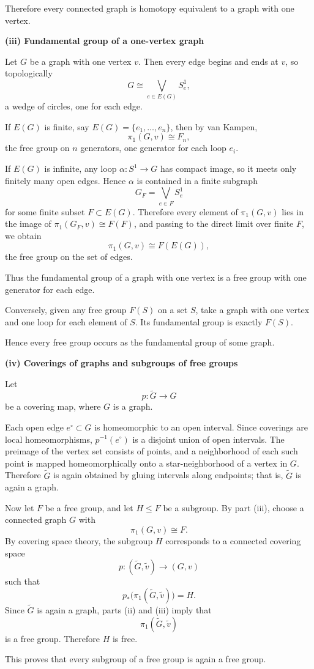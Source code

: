 \begin{solution}
Therefore every connected graph is homotopy equivalent to a graph with one vertex.


\medskip
\noindent\textbf{(iii) Fundamental group of a one-vertex graph}\par
\smallskip

Let \(G\) be a graph with one vertex \(v\). Then every edge begins and ends at \(v\), so topologically
\[
G \cong \bigvee_{e\in E(G)} S^1_e,
\]
a wedge of circles, one for each edge.

If \(E(G)\) is finite, say \(E(G)=\{e_1,\dots,e_n\}\), then by van Kampen,
\[
\pi_1(G,v)\cong F_n,
\]
the free group on \(n\) generators, one generator for each loop \(e_i\).

If \(E(G)\) is infinite, any loop \(\alpha:S^1\to G\) has compact image, so it meets only finitely many open edges. Hence \(\alpha\) is contained in a finite subgraph
\[
G_F=\bigvee_{e\in F} S^1_e
\]
for some finite subset \(F\subset E(G)\). Therefore every element of \(\pi_1(G,v)\) lies in the image of \(\pi_1(G_F,v)\cong F(F)\), and passing to the direct limit over finite \(F\), we obtain
\[
\pi_1(G,v)\cong F(E(G)),
\]
the free group on the set of edges.

Thus the fundamental group of a graph with one vertex is a free group with one generator for each edge.

Conversely, given any free group \(F(S)\) on a set \(S\), take a graph with one vertex and one loop for each element of \(S\). Its fundamental group is exactly \(F(S)\).

Hence every free group occurs as the fundamental group of some graph.


\medskip
\noindent\textbf{(iv) Coverings of graphs and subgroups of free groups}\par
\smallskip

Let
\[
p:\widetilde{G}\longrightarrow G
\]
be a covering map, where \(G\) is a graph.

Each open edge \(e^\circ\subset G\) is homeomorphic to an open interval. Since coverings are local homeomorphisms, \(p^{-1}(e^\circ)\) is a disjoint union of open intervals. The preimage of the vertex set consists of points, and a neighborhood of each such point is mapped homeomorphically onto a star-neighborhood of a vertex in \(G\). Therefore \(\widetilde{G}\) is again obtained by gluing intervals along endpoints; that is, \(\widetilde{G}\) is again a graph.

Now let \(F\) be a free group, and let \(H\leq F\) be a subgroup. By part (iii), choose a connected graph \(G\) with
\[
\pi_1(G,v)\cong F.
\]
By covering space theory, the subgroup \(H\) corresponds to a connected covering space
\[
p:(\widetilde{G},\widetilde{v})\to (G,v)
\]
such that
\[
p_*\bigl(\pi_1(\widetilde{G},\widetilde{v})\bigr)=H.
\]
Since \(\widetilde{G}\) is again a graph, parts (ii) and (iii) imply that
\[
\pi_1(\widetilde{G},\widetilde{v})
\]
is a free group. Therefore \(H\) is free.

This proves that every subgroup of a free group is again a free group.
\end{solution}

